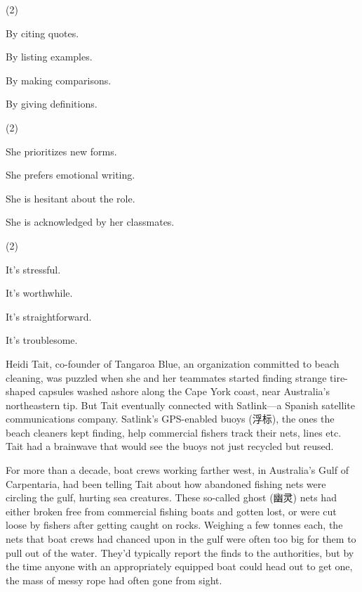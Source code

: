 \documentclass{英语试卷}
\begin{document}
\begin{choices}(2)
  \item By citing quotes.
  \item By listing examples.
  \item By making comparisons.
  \item By giving definitions.
\end{choices}
\begin{choices}(2)
  \item She prioritizes new forms.
  \item She prefers emotional writing.
  \item She is hesitant about the role.
  \item She is acknowledged by her classmates.
\end{choices}
\begin{choices}(2)
  \item It's stressful.
  \item It's worthwhile.
  \item It's straightforward.
  \item It's troublesome.
\end{choices}
\par Heidi Tait, co-founder of Tangaroa Blue, an organization committed to beach cleaning, was puzzled when she and her teammates started finding strange tire-shaped capsules washed ashore along the Cape York coast, near Australia's northeastern tip. But Tait eventually connected with Satlink—a Spanish satellite communications company. Satlink's GPS-enabled buoys (浮标), the ones the beach cleaners kept finding, help commercial fishers track their nets, lines etc. Tait had a brainwave that would see the buoys not just recycled but reused.\par
\par For more than a decade, boat crews working farther west, in Australia's Gulf of Carpentaria, had been telling Tait about how abandoned fishing nets were circling the gulf, hurting sea creatures. These so-called ghost (幽灵) nets had either broken free from commercial fishing boats and gotten lost, or were cut loose by fishers after getting caught on rocks. Weighing a few tonnes each, the nets that boat crews had chanced upon in the gulf were often too big for them to pull out of the water. They'd typically report the finds to the authorities, but by the time anyone with an appropriately equipped boat could head out to get one, the mass of messy rope had often gone from sight.\par
\end{document}
